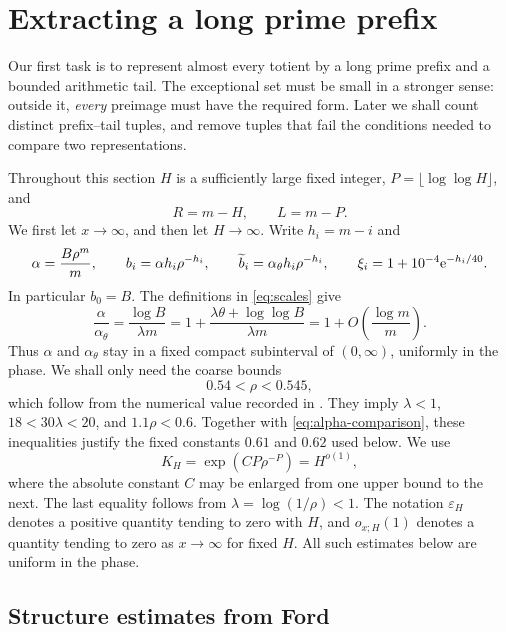 \section{Extracting a long prime prefix}\label{sec:extraction}

Our first task is to represent almost every totient by a long prime
prefix and a bounded arithmetic tail.  The exceptional set must be
small in a stronger sense: outside it, \emph{every} preimage must have
the required form.  Later we shall count distinct prefix--tail tuples,
and remove tuples that fail the conditions needed to compare two
representations.

Throughout this section \(H\) is a sufficiently large fixed integer,
\(P=\lfloor\log\log H\rfloor\), and
\begin{equation}\label{eq:cuts}
 R=m-H,\qquad L=m-P.
\end{equation}
We first let \(x\to\infty\), and then let \(H\to\infty\).
Write \(h_i=m-i\) and
\[
 \alpha=\frac{B\rho^m}{m},\qquad
 b_i=\alpha h_i\rho^{-h_i},\qquad
 \widetilde b_i=\alpha_\theta h_i\rho^{-h_i},\qquad
 \xi_i=1+10^{-4}\mathrm e^{-h_i/40}.
\]
In particular \(b_0=B\).  The definitions in
\eqref{eq:scales} give
\begin{equation}\label{eq:alpha-comparison}
 \frac{\alpha}{\alpha_\theta}
 =\frac{\log B}{\lambda m}
 =1+\frac{\lambda\theta+\log\log B}{\lambda m}
 =1+O\left(\frac{\log m}{m}\right).
\end{equation}
Thus \(\alpha\) and \(\alpha_\theta\) stay in a fixed compact
subinterval of \((0,\infty)\), uniformly in the phase.
We shall only need the coarse bounds
\begin{equation}\label{eq:rho-bounds}
 0.54<\rho<0.545,
\end{equation}
which follow from the numerical value recorded in
\cite[(1.4)]{FordTotients2013}.  They imply
\(\lambda<1\), \(18<30\lambda<20\), and \(1.1\rho<0.6\).
Together with \eqref{eq:alpha-comparison}, these inequalities
justify the fixed constants \(0.61\) and \(0.62\) used below.
We use
\[
 K_H=\exp(CP\rho^{-P})=H^{o(1)},
\]
where the absolute constant \(C\) may be enlarged from one upper bound
to the next.  The last equality follows from
\(\lambda=\log(1/\rho)<1\).
The notation \(\varepsilon_H\) denotes a positive quantity tending to
zero with \(H\), and \(o_{x;H}(1)\) denotes a quantity tending to zero
as \(x\to\infty\) for fixed \(H\).  All such estimates below are uniform
in the phase.

\subsection{Structure estimates from Ford}

